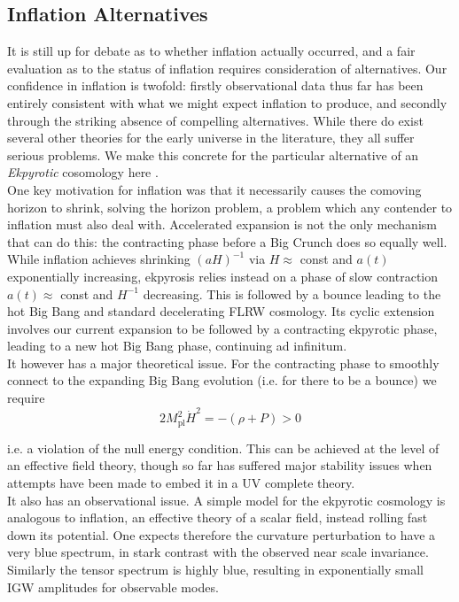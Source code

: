 \documentclass[a4paper,10pt]{article}
\newcommand{\Mp}{M_{\text{pl}}}
\begin{document}
\subsection{Inflation Alternatives}

It is still up for debate as to whether inflation actually occurred, and a fair evaluation as to the status of inflation requires consideration of alternatives. Our confidence in inflation is twofold: firstly observational data thus far has been entirely consistent with what we might expect inflation to produce, and secondly through the striking absence of compelling alternatives. While there do exist several other theories for the early universe in the literature, they all suffer serious problems. We make this concrete for the particular alternative of an \textit{Ekpyrotic} cosomology here \cite{CMBPol}.\\

One key motivation for inflation was that it necessarily causes the comoving horizon to shrink, solving the horizon problem, a problem which any contender to inflation must also deal with. Accelerated expansion is not the only mechanism that can do this: the contracting phase before a Big Crunch does so equally well. While inflation achieves shrinking $(aH)^{-1}$ via $H\approx$ const and $a(t)$ exponentially increasing, ekpyrosis relies instead on a phase of slow contraction $a(t)\approx$ const and $H^{-1}$ decreasing. This is followed by a bounce leading to the hot Big Bang and standard decelerating FLRW cosmology. Its cyclic extension involves our current expansion to be followed by a contracting ekpyrotic phase, leading to a new hot Big Bang phase, continuing ad infinitum.\\

It however has a major theoretical issue. For the contracting phase to smoothly connect to the expanding Big Bang evolution (i.e. for there to be a bounce) we require
\begin{equation}
2\Mp^2\dot{H}^2 = -(\rho + P) > 0
\end{equation} 

i.e. a violation of the null energy condition. This can be achieved at the level of an effective field theory, though so far has suffered major stability issues when attempts have been made to embed it in a UV complete theory.\\

It also has an observational issue. A simple model for the ekpyrotic cosmology is analogous to inflation, an effective theory of a scalar field, instead rolling fast down its potential. One expects therefore the curvature perturbation to have a very blue spectrum, in stark contrast with the observed near scale invariance. Similarly the tensor spectrum is highly blue, resulting in exponentially small IGW amplitudes for observable modes. \\
\end{document}
